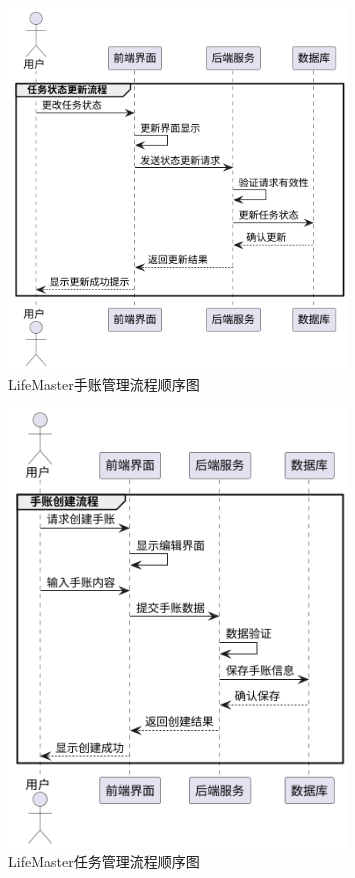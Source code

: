 \documentclass[a4paper]{article}
\begin{document}
\begin{figure}[H]
\centering
\includegraphics[width=0.8\textwidth]{img/sequence_diagram3.png}
\caption{LifeMaster手账管理流程顺序图}
\end{figure}

\begin{figure}[H]
\centering
\includegraphics[width=0.8\textwidth]{img/sequence_diagram4.png}
\caption{LifeMaster任务管理流程顺序图}
\end{figure}
\end{document}
